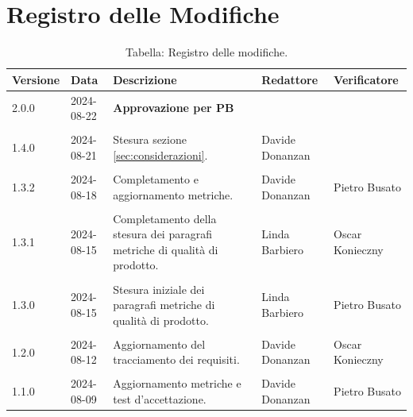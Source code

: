 \documentclass[8pt]{article}
\begin{document}
\section*{Registro delle Modifiche}
\begin{table}[ht!]	
	\centering
	\begin{tabular}{p{1.2cm} p{2cm} p{6cm} p{3cm} p{2cm}}
		\toprule
		\textbf{Versione}& \textbf{Data} & \textbf{Descrizione} & \textbf{Redattore} & \textbf{Verificatore} \\
		\midrule
        2.0.0 & 2024-08-22 & \textbf{Approvazione per PB} & & \\\\
        1.4.0 & 2024-08-21 & Stesura sezione \ref{sec:considerazioni}. & Davide Donanzan &  \\\\
        1.3.2 & 2024-08-18 & Completamento e aggiornamento metriche. & Davide Donanzan & Pietro Busato \\\\
        1.3.1 & 2024-08-15 & Completamento della stesura dei paragrafi metriche di qualità di prodotto. & Linda Barbiero & Oscar Konieczny \\\\
        1.3.0 & 2024-08-15 & Stesura iniziale dei paragrafi metriche di qualità di prodotto. & Linda Barbiero & Pietro Busato \\\\
        1.2.0 & 2024-08-12 & Aggiornamento del tracciamento dei requisiti. & Davide Donanzan & Oscar Konieczny \\\\
        1.1.0 & 2024-08-09 & Aggiornamento metriche e test d'accettazione. & Davide Donanzan & Pietro Busato \\
		\bottomrule
	\end{tabular}
	\caption*{Tabella: Registro delle modifiche.}
	\label{table:Registro delle modifiche}
\end{table}
\newpage
\end{document}
